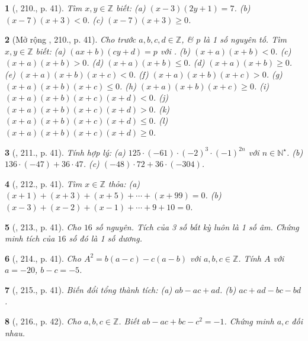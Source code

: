 \documentclass{article}
\newtheorem{baitoan}{}
\begin{document}
\begin{baitoan}[\cite{Tuyen_Toan_6}, 210., p. 41]
	Tìm $x,y\in\mathbb{Z}$ biết: (a) $(x - 3)(2y + 1) = 7$. (b) $(x - 7)(x + 3) < 0$. (c) $(x - 7)(x + 3)\ge0$.
\end{baitoan}

\begin{baitoan}[Mở rộng \cite{Tuyen_Toan_6}, 210., p. 41]
	Cho trước $a,b,c,d\in\mathbb{Z}$, \& $p$ là 1 số nguyên tố. Tìm $x,y\in\mathbb{Z}$ biết: (a) $(ax + b)(cy + d) = p$ với . (b) $(x + a)(x + b) < 0$. (c) $(x + a)(x + b) > 0$. (d) $(x + a)(x + b)\le0$. (d) $(x + a)(x + b)\ge0$. (e) $(x + a)(x + b)(x + c) < 0$. (f) $(x + a)(x + b)(x + c) > 0$. (g) $(x + a)(x + b)(x + c)\le0$. (h) $(x + a)(x + b)(x + c)\ge0$. (i) $(x + a)(x + b)(x + c)(x + d) < 0$. (j) $(x + a)(x + b)(x + c)(x + d) > 0$. (k) $(x + a)(x + b)(x + c)(x + d)\le0$. (l) $(x + a)(x + b)(x + c)(x + d)\ge0$.
\end{baitoan}

\begin{baitoan}[\cite{Tuyen_Toan_6}, 211., p. 41]
	Tính hợp lý: (a) $125\cdot(-61)\cdot(-2)^3\cdot(-1)^{2n}$ với $n\in\mathbb{N}^\star$. (b) $136\cdot(-47) + 36\cdot47$. (c) $(-48)\cdot72 + 36\cdot(-304)$.
\end{baitoan}

\begin{baitoan}[\cite{Tuyen_Toan_6}, 212., p. 41]
	Tìm $x\in\mathbb{Z}$ thỏa: (a) $(x + 1) + (x + 3) + (x + 5) + \cdots + (x + 99) = 0$. (b) $(x - 3) + (x - 2) + (x - 1) + \cdots + 9 + 10 = 0$.
\end{baitoan}

\begin{baitoan}[\cite{Tuyen_Toan_6}, 213., p. 41]
	Cho $16$ số nguyên. Tích của 3 số bất kỳ luôn là 1 số âm. Chứng minh tích của $16$ số đó là 1 số dương.
\end{baitoan}

\begin{baitoan}[\cite{Tuyen_Toan_6}, 214., p. 41]
	Cho $A^2 = b(a - c) - c(a - b)$ với $a,b,c\in\mathbb{Z}$. Tính $A$ với $a = -20$, $b - c = -5$.
\end{baitoan}

\begin{baitoan}[\cite{Tuyen_Toan_6}, 215., p. 41]
	Biến đổi tổng thành tích: (a) $ab - ac + ad$. (b) $ac + ad - bc - bd$.
\end{baitoan}

\begin{baitoan}[\cite{Tuyen_Toan_6}, 216., p. 42]
	Cho $a,b,c\in\mathbb{Z}$. Biết $ab - ac + bc - c^2 = -1$. Chứng minh $a,c$ đối nhau.
\end{baitoan}
\end{document}
